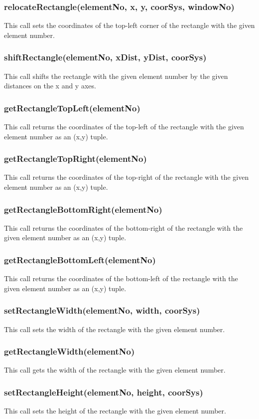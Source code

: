 \documentclass{acm_proc_article-sp}
\begin{document}
\subsubsection{relocateRectangle(elementNo, x, y, coorSys, windowNo)}
This call sets the coordinates of the top-left corner of the rectangle with the given element number.
\subsubsection{shiftRectangle(elementNo, xDist, yDist, coorSys)}
This call shifts the rectangle with the given element number by the given distances on the x and y axes.
\subsubsection{getRectangleTopLeft(elementNo)}
This call returns the coordinates of the top-left of the rectangle with the given element number as an (x,y) tuple.
\subsubsection{getRectangleTopRight(elementNo)}
This call returns the coordinates of the top-right of the rectangle with the given element number as an (x,y) tuple.
\subsubsection{getRectangleBottomRight(elementNo)}
This call returns the coordinates of the bottom-right of the rectangle with the given element number as an (x,y) tuple.
\subsubsection{getRectangleBottomLeft(elementNo)}
This call returns the coordinates of the bottom-left of the rectangle with the given element number as an (x,y) tuple.
\subsubsection{setRectangleWidth(elementNo, width, coorSys)}
This call sets the width of the rectangle with the given element number.
\subsubsection{getRectangleWidth(elementNo)}
This call gets the width of the rectangle with the given element number.
\subsubsection{setRectangleHeight(elementNo, height, coorSys)}
This call sets the height of the rectangle with the given element number.
\end{document}
